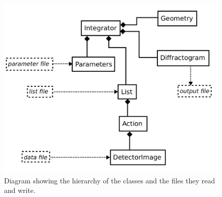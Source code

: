 \documentclass[a4paper, 12pt, twoside]{scrartcl}
\begin{document}
\begin{figure}
	\includegraphics[width=15cm]{figs/class_diagram.pdf}
	\caption{\label{fig:class_diagram}Diagram showing the hierarchy of the classes and the files they read and write.}
\end{figure}
\end{document}

